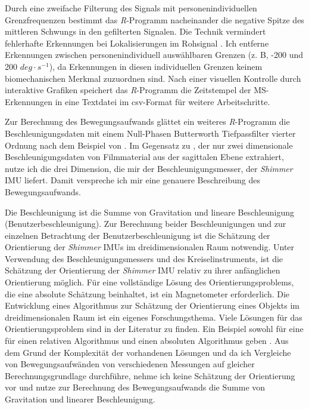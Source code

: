 Durch eine zweifache Filterung des Signals mit personenindividuellen Grenzfrequenzen bestimmt das \emph{R}-Programm nacheinander die negative Spitze des mittleren Schwungs in den gefilterten Signalen. Die Technik vermindert fehlerhafte Erkennungen bei Lokalisierungen im Rohsignal \citep[vgl.][]{Lee2011}. Ich entferne Erkennungen zwischen personenindividuell auswählbaren Grenzen (z. B, -200 und 200 $deg \cdot s^{-1}$), da Erkennungen in diesen individuellen Grenzen keinem biomechanischen Merkmal zuzuordnen sind. Nach einer visuellen Kontrolle durch interaktive Grafiken speichert das \emph{R}-Programm die Zeitstempel der \ac{MS}-Erkennungen in eine Textdatei im \acs{csv}-Format für weitere Arbeitschritte.

Zur Berechnung des Bewegungsaufwands glättet ein weiteres \emph{R}-Programm die Beschleunigungsdaten mit einem Null-Phasen Butterworth Tiefpassfilter vierter Ordnung nach dem Beispiel von \citet{Hreljac2000}. Im Gegensatz zu \citet{Hreljac2000}, der nur zwei dimensionale Beschleunigungsdaten von Filmmaterial aus der sagittalen Ebene extrahiert, nutze ich die drei Dimension, die mir der Beschleunigungsmesser, der \emph{Shimmer} \ac{IMU} liefert. Damit verspreche ich mir eine genauere Beschreibung des Bewegungsaufwands.

Die Beschleunigung ist die Summe von Gravitation und lineare Beschleunigung (Benutzerbeschleunigung). Zur Berechnung beider Beschleunigungen und zur einzelnen Betrachtung der Benutzerbeschleunigung ist die Schätzung der Orientierung der \emph{Shimmer} \acp{IMU} im dreidimensionalen Raum notwendig. Unter Verwendung des Beschleunigungsmessers und des Kreiselinstruments, ist die Schätzung der Orientierung der \emph{Shimmer} \ac{IMU} relativ zu ihrer anfänglichen Orientierung möglich. Für eine vollständige Lösung des Orientierungsproblems, die eine absolute Schätzung beinhaltet, ist ein Magnetometer erforderlich. Die Entwicklung eines Algorithmus zur Schätzung der Orientierung eines Objekts im dreidimensionalen Raum ist ein eigenes Forschungsthema. Viele Lösungen für das Orientierungsproblem sind in der Literatur zu finden. Ein Beispiel sowohl für eine für einen relativen Algorithmus und einen absoluten Algorithmus geben \citet{Madgwick2011}. Aus dem Grund der Komplexität der vorhandenen Lösungen und da ich Vergleiche von Bewegungsaufwänden von verschiedenen Messungen auf gleicher Berechnungsgrundlage durchführe, nehme ich keine Schätzung der Orientierung vor und nutze zur Berechnung des Bewegungsaufwands die Summe von Gravitation und linearer Beschleunigung.

